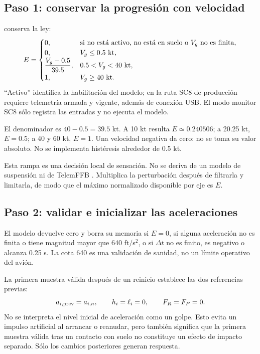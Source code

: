 \subsection{Paso 1: conservar la progresión con velocidad}
 conserva la ley:
\begin{equation}
E=\begin{cases}
0,&\text{si no está activo, no está en suelo o }V_g\text{ no es finita},\\
0,&V_g\le0.5\ {\rm kt},\\
\displaystyle\frac{V_g-0.5}{39.5},&0.5<V_g<40\ {\rm kt},\\[3pt]
1,&V_g\ge40\ {\rm kt}.
\end{cases}
\label{eq:ground-envelope}
\end{equation}
``Activo'' identifica la habilitación del modelo; en la ruta SC8 de producción requiere telemetría armada y vigente, además de conexión USB. El modo monitor SC8 sólo registra las entradas y no ejecuta el modelo.

El denominador es $40-0.5=39.5$ kt. A 10 kt resulta $E\simeq0.240506$; a 20.25 kt, $E=0.5$; a 40 y 60 kt, $E=1$. Una velocidad negativa da cero: no se toma su valor absoluto. No se implementa histéresis alrededor de 0.5 kt.

Esta rampa es una decisión local de sensación. No se deriva de un modelo de suspensión ni de TelemFFB \cite{telemffb}. Multiplica la perturbación después de filtrarla y limitarla, de modo que el máximo normalizado disponible por eje es $E$.

\subsection{Paso 2: validar e inicializar las aceleraciones}
El modelo devuelve cero y borra su memoria si $E=0$, si alguna aceleración no es finita o tiene magnitud mayor que 640 ft/s$^2$, o si $\Delta t$ no es finito, es negativo o alcanza 0.25 s. La cota 640 es una validación de sanidad, no un límite operativo del avión.

La primera muestra válida después de un reinicio establece las dos referencias previas:
\begin{equation}
a_{i,\rm prev}=a_{i,n},\qquad h_i=\ell_i=0,\qquad F_R=F_P=0.
\end{equation}
No se interpreta el nivel inicial de aceleración como un golpe. Esto evita un impulso artificial al arrancar o reanudar, pero también significa que la primera muestra válida tras un contacto con suelo no constituye un efecto de impacto separado. Sólo los cambios posteriores generan respuesta.


